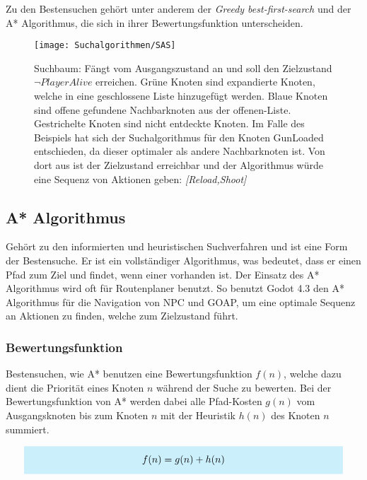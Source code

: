 Zu den Bestensuchen gehört unter anderem der \textit{Greedy best-first-search} und der A* Algorithmus, die sich in ihrer Bewertungsfunktion unterscheiden.




\begin{figure}[h]
  \centering
  \texttt{[image: Suchalgorithmen/SAS]}
	\captionsetup{justification=justified, format=plain}
  \caption{Suchbaum: Fängt vom Ausgangszustand an und soll den Zielzustand $\lnot \textit{PlayerAlive}$ erreichen. Grüne Knoten sind expandierte Knoten, welche in eine geschlossene Liste hinzugefügt werden. Blaue Knoten sind offene gefundene Nachbarknoten aus der offenen-Liste. Gestrichelte Knoten sind nicht entdeckte Knoten. Im Falle des Beispiels hat sich der Suchalgorithmus für den Knoten GunLoaded entschieden, da dieser optimaler als andere Nachbarknoten ist. Von dort aus ist der Zielzustand erreichbar und der Algorithmus würde eine Sequenz von Aktionen geben: \textit{[Reload,Shoot]}}
  \label{Suchalgorithmen}
\end{figure}
\clearpage

\subsection{A* Algorithmus}

Gehört zu den informierten und heuristischen Suchverfahren und ist eine Form der Bestensuche. Er ist ein vollständiger Algorithmus, was bedeutet, dass er einen Pfad zum Ziel und findet, wenn einer vorhanden ist. Der Einsatz des A* Algorithmus wird oft für Routenplaner benutzt. So benutzt Godot 4.3 den A* Algorithmus für die Navigation von NPC und GOAP, um eine optimale Sequenz an Aktionen zu finden, welche zum Zielzustand führt.

\subsubsection{Bewertungsfunktion}

Bestensuchen, wie A* benutzen eine Bewertungsfunktion $f(n)$, welche dazu dient die Priorität eines Knoten $n$ während der Suche zu bewerten. Bei der Bewertungsfunktion von A* werden dabei alle Pfad-Kosten $g(n)$ vom Ausgangsknoten bis zum Knoten $n$ mit der Heuristik $h(n)$ des Knoten $n$ summiert.

\[
\highlightbox{0.9\textwidth}{$
    \begin{aligned}
			f(n) = g(n) + h(n)
    \end{aligned}
$}
\]

